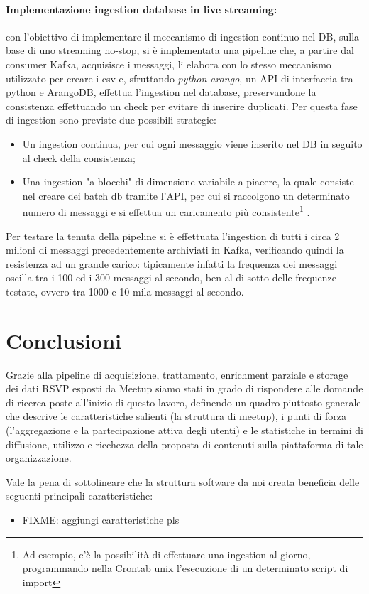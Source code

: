 \documentclass[fleqn,10pt]{SelfArx} %
\begin{document}
{{\paragraph{Implementazione ingestion database in live streaming:}
con l'obiettivo di implementare il meccanismo di ingestion continuo nel DB, sulla base di uno streaming no-stop, si è implementata una pipeline che, a partire dal consumer Kafka, acquisisce i messaggi, li elabora con lo stesso meccanismo utilizzato per creare i csv e, sfruttando \textit{python-arango}, un API di interfaccia tra python e ArangoDB, effettua l'ingestion nel database, preservandone la consistenza effettuando un check per evitare di inserire duplicati. 
Per questa fase di ingestion sono previste due possibili strategie:
\begin{itemize}[noitemsep]
\item Un ingestion continua, per cui ogni messaggio viene inserito nel DB in seguito al check della consistenza;
\item Una ingestion "a blocchi" di dimensione variabile a piacere, la quale consiste nel creare dei batch db tramite l’API, per cui si raccolgono un determinato
numero di messaggi e si effettua un caricamento più consistente\footnote{Ad esempio, c’è la possibilità di effettuare una ingestion al giorno, programmando nella Crontab unix l’esecuzione di un determinato script di import} .
\end{itemize}
Per testare la tenuta della pipeline si è effettuata l'ingestion di tutti i circa 2 milioni di messaggi precedentemente archiviati in Kafka, verificando quindi la resistenza ad un grande carico: tipicamente infatti la frequenza dei messaggi oscilla tra i 100 ed i 300 messaggi al secondo, ben al di sotto delle frequenze testate, ovvero tra 1000 e 10 mila messaggi al secondo.
}
\section{Conclusioni}
Grazie alla pipeline di acquisizione, trattamento, enrichment parziale e storage dei dati RSVP esposti da Meetup siamo stati in grado di rispondere alle domande di ricerca poste all'inizio di questo lavoro, definendo un quadro piuttosto generale che descrive le caratteristiche salienti (la struttura di meetup), i punti di forza (l'aggregazione e la partecipazione attiva degli utenti) e le statistiche in termini di diffusione, utilizzo e ricchezza della proposta di contenuti sulla piattaforma di tale organizzazione. 

Vale la pena di sottolineare che la struttura software da noi creata beneficia delle seguenti principali caratteristiche:
\begin{itemize}
\item FIXME: aggiungi caratteristiche pls
\end{itemize}

}
\end{document}
